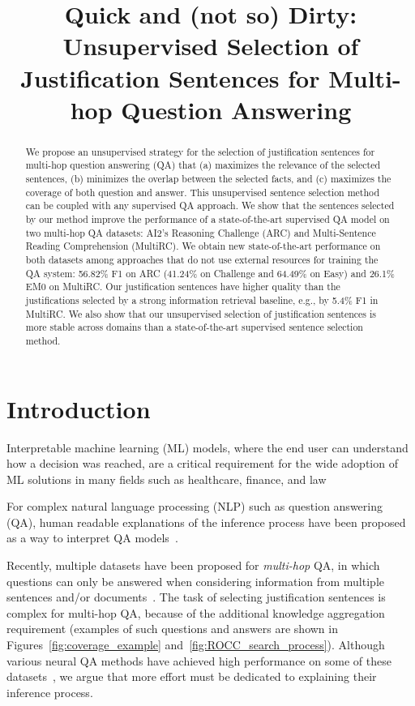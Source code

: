 \title{Quick and (not so) Dirty: Unsupervised Selection of Justification Sentences for Multi-hop Question Answering}

\begin{abstract}
We propose an unsupervised strategy for the selection of justification sentences for multi-hop question answering (QA) that (a) maximizes the relevance of the selected sentences, (b) minimizes the overlap between the selected facts, and (c) maximizes the coverage of both question and answer. This unsupervised sentence selection method can be coupled with any supervised QA approach. We show that the sentences selected by our method improve the performance of a state-of-the-art supervised QA model on two multi-hop QA datasets: AI2's Reasoning Challenge (ARC) and Multi-Sentence Reading Comprehension (MultiRC). We obtain new state-of-the-art performance on both datasets among approaches that do not use external resources for training the QA system: 56.82\% F1 on ARC (41.24\% on Challenge and 64.49\% on Easy) and 26.1\% EM0 on MultiRC. Our justification sentences have higher quality than the justifications selected by a strong information retrieval baseline, e.g., by 5.4\% F1 in MultiRC. We also show that our unsupervised selection of justification sentences is more stable across domains than a state-of-the-art supervised sentence selection method.
\end{abstract}

\section{Introduction}

Interpretable machine learning (ML) models, where the end user can understand how a decision was reached, are a critical requirement for the wide adoption of ML solutions in many fields such as healthcare, finance, and law~\cite{samek2017explainable, alvarez2017causal, arras2017relevant, gilpin2018explaining, biran2017explanation} 

For complex natural language processing (NLP) such as question answering (QA),  human readable explanations of the inference process have been proposed as a way to interpret QA models~\cite{zhou2018interpretable}.

Recently, multiple datasets have been proposed for {\em multi-hop} QA, in which questions can only be answered when considering information from multiple sentences and/or documents~\cite{clark2018think, khashabi2018looking, yang2018hotpotqa, welbl2018constructing, mihaylov2018can, bauer2018commonsense, dunn2017searchqa, dhingra2017quasar, lai2017race, rajpurkar2018know, sun2019dream}. The task of selecting justification sentences is complex for multi-hop QA, because of the additional knowledge aggregation requirement (examples of such questions and answers are shown in Figures~\ref{fig:coverage_example} and~\ref{fig:ROCC_search_process}).
Although various neural QA methods have achieved high performance on some of these datasets~\cite{sun2018improving, trivedi2019repurposing, Tymoshenko2017RankingKF, seo2016bidirectional, wang2016compare, de2018question,back2018memoreader}, we argue that more effort must be dedicated to explaining their inference process. 

